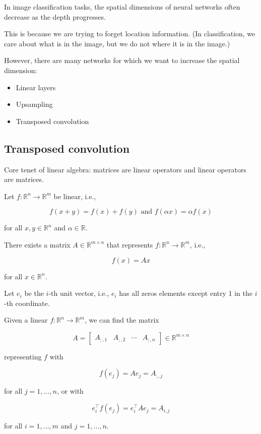 \begin{concept}
    In image classification tasks, the spatial dimensions of neural networks often decrease as the depth progresses.

    This is because we are trying to forget location information. (In classification, we care about what is in the image, but we do not where it is in the image.)

    However, there are many networks for which we want to increase the spatial dimension:

    \begin{itemize}
        \item Linear layers
        \item Upsampling
        \item Transposed convolution
    \end{itemize}
\end{concept}

\subsection{Transposed convolution}

\begin{concept}
    Core tenet of linear algebra: matrices are linear operators and linear operators are matrices.

    Let $f: \mathbb{R}^{n} \rightarrow \mathbb{R}^{m}$ be linear, i.e.,

    $$
    f(x+y)=f(x)+f(y) \text { and } f(\alpha x)=\alpha f(x)
    $$

    for all $x, y \in \mathbb{R}^{n}$ and $\alpha \in \mathbb{R}$.

    There exists a matrix $A \in \mathbb{R}^{m \times n}$ that represents $f: \mathbb{R}^{n} \rightarrow \mathbb{R}^{m}$, i.e.,

    $$
    f(x)=A x
    $$

    for all $x \in \mathbb{R}^{n}$.

    Let $e_{i}$ be the $i$-th unit vector, i.e., $e_{i}$ has all zeros elements except entry 1 in the $i$-th coordinate.

    Given a linear $f: \mathbb{R}^{n} \rightarrow \mathbb{R}^{m}$, we can find the matrix

    $$
    A=\left[\begin{array}{llll}
    A_{;, 1} & A_{;, 2} & \cdots & A_{;, n}
    \end{array}\right] \in \mathbb{R}^{m \times n}
    $$

    representing $f$ with

    $$
    f\left(e_{j}\right)=A e_{j}=A_{;, j}
    $$

    for all $j=1, \ldots, n$, or with

    $$
    e_{i}^{\top} f\left(e_{j}\right)=e_{i}^{\top} A e_{j}=A_{i, j}
    $$

    for all $i=1, \ldots, m$ and $j=1, \ldots, n$.
\end{concept}


